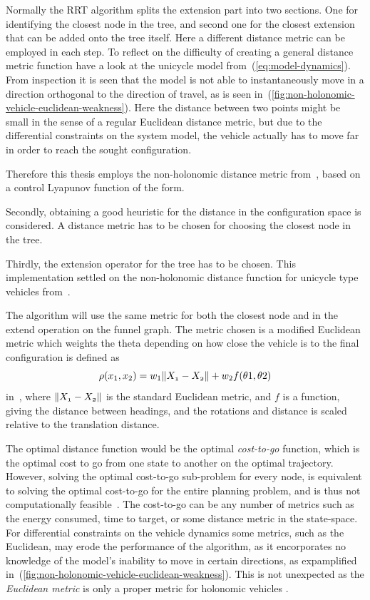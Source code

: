 Normally the \ac{RRT} algorithm splits the extension part into two sections. One
for identifying the closest node in the tree, and second one for the closest
extension that can be added onto the tree itself. Here a different distance
metric can be employed in each step. To reflect on the difficulty of creating a
general distance metric function have a look at the unicycle model
from~(\ref{eq:model-dynamics}). From inspection it is seen that the model is not
able to instantaneously move in a direction orthogonal to the direction of
travel, as is seen in~(\ref{fig:non-holonomic-vehicle-euclidean-weakness}). Here
the distance between two points might be small in the sense of a regular
Euclidean distance metric, but due to the differential constraints on the system
model, the vehicle actually has to move far in order to reach the sought
configuration.

Therefore this thesis employs the non-holonomic distance metric
from~\cite{parkFeedbackMotionPlanning2015}, based on a control Lyapunov function
of the form.

Secondly, obtaining a good heuristic for the distance in the configuration space
is considered. A distance metric has to be chosen for choosing the closest node in
the tree.

Thirdly, the extension operator for the tree has to be chosen. This
implementation settled on the non-holonomic distance function for unicycle type
vehicles from~\cite{parkFeedbackMotionPlanning2015}.

The \rrtfunnel{} algorithm will use the same metric for both the closest node
and in the extend operation on the funnel graph. The metric chosen is a modified
Euclidean metric which weights the theta depending on how close the vehicle is
to the final configuration is defined as
\[
  \rho(x_{1},x_{2}) = w_{1}\lVert\mathnormal{X_{1}} - \mathnormal{X_{2}}\rVert +
  w_{2}f(\theta{1},\theta{2})
\]
in~\cite{kuffnerEffectiveSamplingDistance2004}, where \(\lVert\mathnormal{X_{1}}
  - \mathnormal{X_{2}}\rVert\) is the standard Euclidean metric, and \(f\) is a
function, giving the distance between headings, and the rotations and distance
is scaled relative to the translation distance.


The optimal distance function would be the optimal \textit{cost-to-go} function,
which is the optimal cost to go from one state to another on the optimal
trajectory. However, solving the optimal cost-to-go sub-problem for every node,
is equivalent to solving the optimal cost-to-go for the entire planning problem,
and is thus not computationally feasible~\cite{Lav06}. The cost-to-go can be any
number of metrics such as the energy consumed, time to target, or some distance
metric in the state-space. For differential constraints on the vehicle dynamics
some metrics, such as the Euclidean, may erode the performance of the algorithm,
as it encorporates no knowledge of the model's inability to move in certain
directions, as expamplified
in~(\ref{fig:non-holonomic-vehicle-euclidean-weakness}). This is not unexpected
as the \textit{Euclidean metric} is only a proper metric for holonomic vehicles
\cite{parkFeedbackMotionPlanning2015}.

